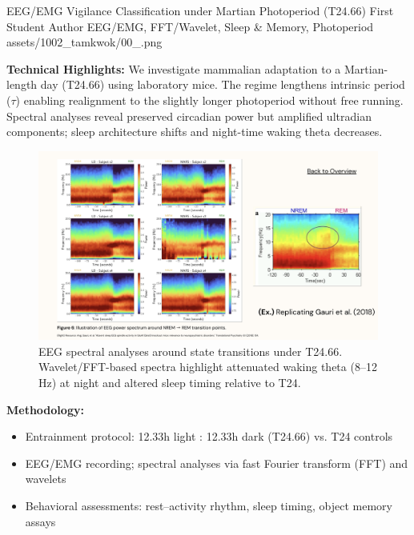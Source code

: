 \ProjectEntry
{EEG/EMG Vigilance Classification under Martian Photoperiod (T24.66)}
{First Student Author}
{EEG/EMG, FFT/Wavelet, Sleep \& Memory, Photoperiod}
{
}
{assets/1002_tamkwok/00_.png}
{ \quad {}}
{  }

\vspace{1em}

\textbf{Technical Highlights:}
We investigate mammalian adaptation to a Martian-length day (T24.66) using laboratory mice. The regime lengthens intrinsic period (\(\tau\)) enabling realignment to the slightly longer photoperiod without free running. Spectral analyses reveal preserved circadian power but amplified ultradian components; sleep architecture shifts and night-time waking theta decreases.

\begin{figure}[ht]
  \centering
  \includegraphics[width=0.85\linewidth]{assets/1002_tamkwok/01_.png}
  \caption{EEG spectral analyses around state transitions under T24.66. Wavelet/FFT-based spectra highlight attenuated waking theta (8--12 Hz) at night and altered sleep timing relative to T24.}
  \label{fig:t2466_spectra}
\end{figure}

\textbf{Methodology:}
\begin{itemize}[leftmargin=1.2em, itemsep=0.1em]
  \item Entrainment protocol: 12.33h light : 12.33h dark (T24.66) vs. T24 controls
  \item EEG/EMG recording; spectral analyses via fast Fourier transform (FFT) and wavelets
  \item Behavioral assessments: rest–activity rhythm, sleep timing, object memory assays
\end{itemize}

